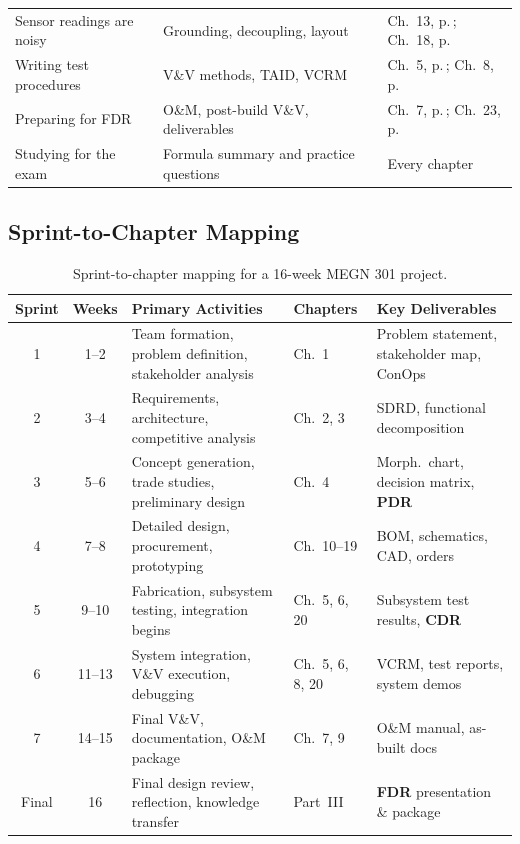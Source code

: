 \documentclass[11pt,letterpaper,twoside,openany]{book}
\begin{document}
\begin{center}
\begin{tabularx}{\textwidth}{l X l}
Sensor readings are noisy & Grounding, decoupling, layout & Ch.~13, p.\,\pageref{ch:electronics}; Ch.~18, p.\,\pageref{ch:pcb} \\
Writing test procedures & V\&V methods, TAID, VCRM & Ch.~5, p.\,\pageref{ch:vv}; Ch.~8, p.\,\pageref{ch:postbuild} \\
Preparing for FDR & O\&M, post-build V\&V, deliverables & Ch.~7, p.\,\pageref{ch:oandm}; Ch.~23, p.\,\pageref{ch:fdr} \\
Studying for the exam & Formula summary and practice questions & Every chapter \\
\bottomrule
\end{tabularx}
\end{center}

\subsection*{Sprint-to-Chapter Mapping}

\begin{table}[htbp]
\centering\small
\begin{tabularx}{\textwidth}{c c X l X}
\toprule
\textbf{Sprint} & \textbf{Weeks} & \textbf{Primary Activities} & \textbf{Chapters} & \textbf{Key Deliverables} \\
\midrule
1 & 1--2 & Team formation, problem definition, stakeholder analysis & Ch.~1 & Problem statement, stakeholder map, ConOps \\
2 & 3--4 & Requirements, architecture, competitive analysis & Ch.~2, 3 & SDRD, functional decomposition \\
3 & 5--6 & Concept generation, trade studies, preliminary design & Ch.~4 & Morph.\ chart, decision matrix, \textbf{PDR} \\
4 & 7--8 & Detailed design, procurement, prototyping & Ch.~10--19 & BOM, schematics, CAD, orders \\
5 & 9--10 & Fabrication, subsystem testing, integration begins & Ch.~5, 6, 20 & Subsystem test results, \textbf{CDR} \\
6 & 11--13 & System integration, V\&V execution, debugging & Ch.~5, 6, 8, 20 & VCRM, test reports, system demos \\
7 & 14--15 & Final V\&V, documentation, O\&M package & Ch.~7, 9 & O\&M manual, as-built docs \\
Final & 16 & Final design review, reflection, knowledge transfer & Part~III & \textbf{FDR} presentation \& package \\
\bottomrule
\end{tabularx}
\caption{Sprint-to-chapter mapping for a 16-week MEGN 301 project.}
\end{table}
\end{document}
